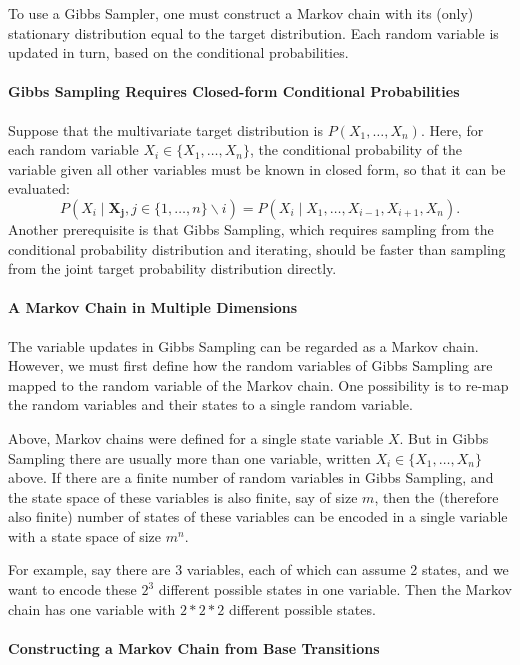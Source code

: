 To use a Gibbs Sampler, one must construct a Markov chain with its
(only) stationary distribution equal to the target distribution. Each
random variable is updated in turn, based on the conditional probabilities.

\paragraph{Gibbs Sampling Requires Closed-form Conditional Probabilities}

Suppose that the multivariate target distribution is $P(X_{1},\dots,X_{n})$.
Here, for each random variable $X_{i}\in\{X_{1},\dots,X_{n}\}$, the
conditional probability of the variable given all other variables
must be known in closed form, so that it can be evaluated: 
\[
P(X_{i}\mid\mathbf{X_{j}},j\in\{1,\dots,n\}\backslash i)=P(X_{i}\mid X_{1},\dots,X_{i-1},X_{i+1},X_{n}).
\]
Another prerequisite is that Gibbs Sampling, which requires sampling
from the conditional probability distribution and iterating, should
be faster than sampling from the joint target probability distribution
directly.

\paragraph{A Markov Chain in Multiple Dimensions}

The variable updates in Gibbs Sampling can be regarded as a Markov
chain. However, we must first define how the random variables of Gibbs
Sampling are mapped to the random variable of the Markov chain. One
possibility is to re-map the random variables and their states to
a single random variable.

Above, Markov chains were defined for a single state variable $X$.
But in Gibbs Sampling there are usually more than one variable, written
$X_{i}\in\{X_{1},\dots,X_{n}\}$ above. If there are a finite number
of random variables in Gibbs Sampling, and the state space of these
variables is also finite, say of size $m$, then the (therefore also
finite) number of states of these variables can be encoded in a single
variable with a state space of size $m^{n}$.

For example, say there are 3 variables, each of which can assume 2
states, and we want to encode these $2^{3}$ different possible states
in one variable. Then the Markov chain has one variable with $2*2*2$
different possible states.

\paragraph{Constructing a Markov Chain from Base Transitions}


